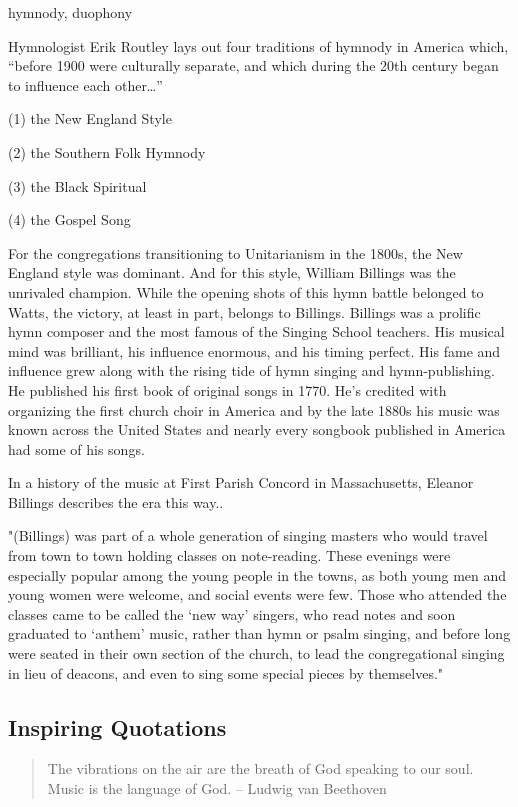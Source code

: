 \documentclass[12pt]{article}
\begin{document}
hymnody, duophony

Hymnologist Erik Routley lays out four traditions of hymnody in America which, “before 1900 were culturally separate, and which during the 20th century began to influence each other…”

(1) the New England Style

(2) the Southern Folk Hymnody

(3) the Black Spiritual

(4) the Gospel Song

For the congregations transitioning to Unitarianism in the 1800s, the New England style was dominant. And for this style, William Billings was the unrivaled champion. While the opening shots of this hymn battle belonged to Watts, the victory, at least in part, belongs to Billings. Billings was a prolific hymn composer and the most famous of the Singing School teachers. His musical mind was brilliant, his influence enormous, and his timing perfect. His fame and influence grew along with the rising tide of hymn singing and hymn-publishing. He published his first book of original songs in 1770. He’s credited with organizing the first church choir in America and by the late 1880s his music was known across the United States and nearly every songbook published in America had some of his songs.

In a history of the music at First Parish Concord in Massachusetts, Eleanor Billings describes the era this way..

"(Billings) was part of a whole generation of singing masters who would travel from town to town holding classes on note-reading. These evenings were especially popular among the young people in the towns, as both young men and young women were welcome, and social events were few. Those who attended the classes came to be called the ‘new way’ singers, who read notes and soon graduated to ‘anthem’ music, rather than hymn or psalm singing, and before long were seated in their own section of the church, to lead the congregational singing in lieu of deacons, and even to sing some special pieces by themselves."

\subsection*{Inspiring Quotations}

\begin{quote}
  The vibrations on the air are the breath of God speaking to our soul. Music is the language of God. – Ludwig van Beethoven
\end{quote}
\end{document}
